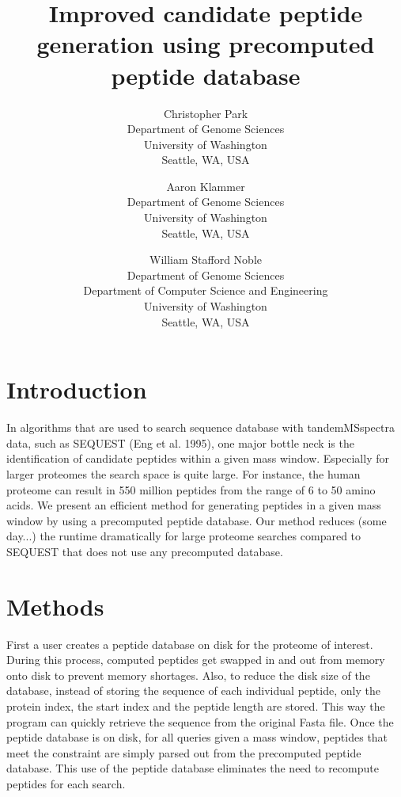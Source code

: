 \documentclass[12pt]{article}
\begin{document}
\title{Improved candidate peptide generation using precomputed peptide
database}

\author{
Christopher Park\\
Department of Genome Sciences\\
University of Washington\\
Seattle, WA, USA
\and
Aaron Klammer\\
Department of Genome Sciences\\
University of Washington\\
Seattle, WA, USA
\and
William Stafford Noble\\
Department of Genome Sciences\\
Department of Computer Science and Engineering\\
University of Washington\\
Seattle, WA, USA
}

\maketitle

\section{Introduction}

In algorithms that are used to search sequence database with
tandemMSspectra data,  such as SEQUEST (Eng et al. 1995), one major
bottle neck is the identification of  candidate peptides within a
given mass window. Especially for larger proteomes the  search space
is quite large. For instance, the human proteome can result in 550
million  peptides from the range of 6 to 50 amino acids. We present an
efficient method for  generating peptides in a given mass window by
using a precomputed peptide  database. Our method reduces (some
day...) the runtime dramatically for large  proteome searches compared
to SEQUEST that does not use any precomputed  database. 

\section{Methods}

First a user creates a peptide database on disk for the proteome of
interest. During this  process, computed peptides get swapped in and
out from memory onto disk to prevent  memory shortages. Also, to
reduce the disk size of the database, instead of storing the  sequence
of each individual peptide, only the protein index, the start index
and the  peptide length are stored. This way the program can quickly
retrieve the sequence  from the original Fasta file. Once the peptide
database is on disk, for all queries given a mass window,  peptides
that meet the constraint are simply parsed out from the precomputed
peptide  database. This use of the peptide database eliminates the
need to recompute peptides  for each search.
\end{document}

